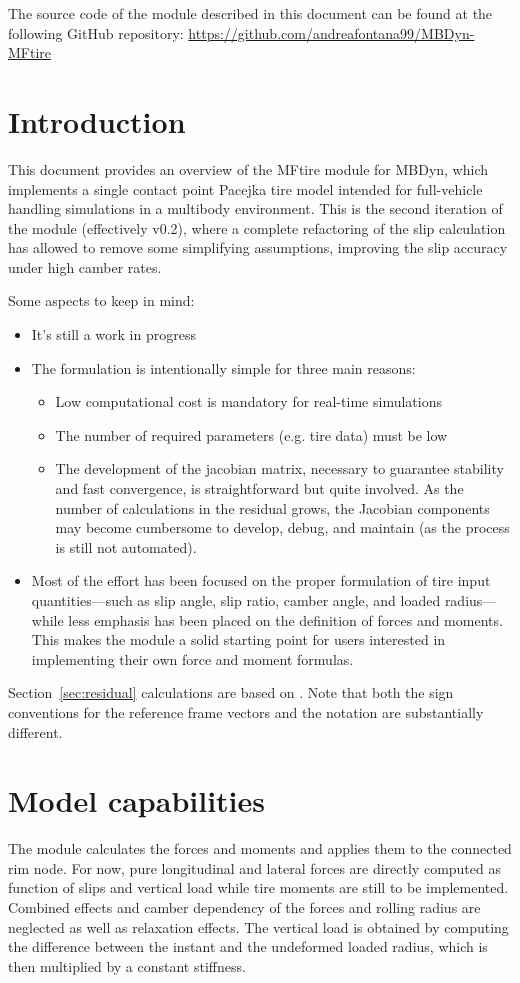 The source code of the module described in this document can be found at the following GitHub repository:
\url{https://github.com/andreafontana99/MBDyn-MFtire}
\section{Introduction}
This document provides an overview of the MFtire module for MBDyn, which implements a single contact point Pacejka tire model intended for full-vehicle handling simulations in a multibody environment.
This is the second iteration of the module (effectively v0.2), where a complete refactoring of the slip calculation has allowed to remove some simplifying assumptions, improving the slip accuracy under high camber rates.

Some aspects to keep in mind:
\begin{itemize}
    \item It's still a work in progress
    \item The formulation is intentionally simple for three main reasons:
        \begin{itemize}
            \item Low computational cost is mandatory for real-time simulations
            \item The number of required parameters (e.g. tire data) must be low
            \item The development of the jacobian matrix, necessary to guarantee stability and fast convergence, is straightforward but quite involved. As the number of calculations in the residual grows, the Jacobian components may become cumbersome to develop, debug, and maintain (as the process is still not automated).
    \end{itemize}
    \item Most of the effort has been focused on the proper formulation of tire input quantities—such as slip angle, slip ratio, camber angle, and loaded radius—while less emphasis has been placed on the definition of forces and moments. This makes the module a solid starting point for users interested in implementing their own force and moment formulas.
\end{itemize}

Section~\ref{sec:residual} calculations are based on \cite{pacejka2012tireChap5}. Note that both the sign conventions for the reference frame vectors and the notation are substantially different.

\section{Model capabilities}
The module calculates the forces and moments and applies them to the connected rim node. For now, pure longitudinal and lateral forces are directly computed as function of slips and vertical load while tire moments are still to be implemented. Combined effects and camber dependency of the forces and rolling radius are neglected as well as relaxation effects.
The vertical load is obtained by computing the difference between the instant and the undeformed loaded radius, which is then multiplied by a constant stiffness.

